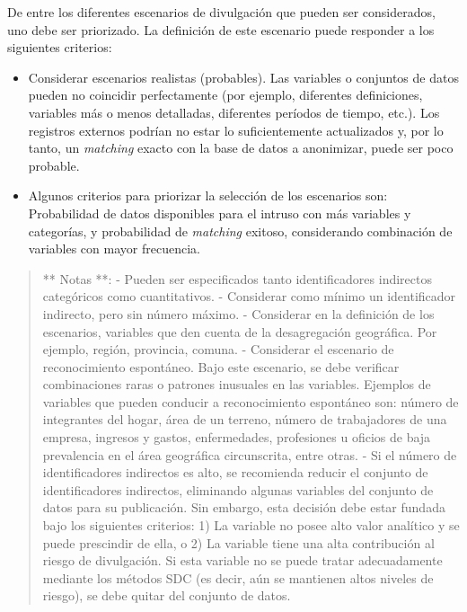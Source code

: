 \documentclass[
]{book}
\providecommand{\tightlist}{%
  \setlength{\itemsep}{0pt}\setlength{\parskip}{0pt}}
\theoremstyle{definition}
\theoremstyle{definition}
\theoremstyle{definition}
\theoremstyle{definition}
\theoremstyle{remark}
\begin{document}
De entre los diferentes escenarios de divulgación que pueden ser considerados, uno debe ser priorizado. La definición de este escenario puede responder a los siguientes criterios:

\begin{itemize}
\tightlist
\item
  Considerar escenarios realistas (probables). Las variables o conjuntos de datos pueden no coincidir perfectamente (por ejemplo, diferentes definiciones, variables más o menos detalladas, diferentes períodos de tiempo, etc.). Los registros externos podrían no estar lo suficientemente actualizados y, por lo tanto, un \emph{matching} exacto con la base de datos a anonimizar, puede ser poco probable.
\item
  Algunos criterios para priorizar la selección de los escenarios son: Probabilidad de datos disponibles para el intruso con más variables y categorías, y probabilidad de \emph{matching} exitoso, considerando combinación de variables con mayor frecuencia.
\end{itemize}

\begin{quote}
** Notas **:
- Pueden ser especificados tanto identificadores indirectos categóricos como cuantitativos. - Considerar como mínimo un identificador indirecto, pero sin número máximo.
- Considerar en la definición de los escenarios, variables que den cuenta de la desagregación geográfica. Por ejemplo, región, provincia, comuna.
- Considerar el escenario de reconocimiento espontáneo. Bajo este escenario, se debe verificar combinaciones raras o patrones inusuales en las variables. Ejemplos de variables que pueden conducir a reconocimiento espontáneo son: número de integrantes del hogar, área de un terreno, número de trabajadores de una empresa, ingresos y gastos, enfermedades, profesiones u oficios de baja prevalencia en el área geográfica circunscrita, entre otras.
- Si el número de identificadores indirectos es alto, se recomienda reducir el conjunto de identificadores indirectos, eliminando algunas variables del conjunto de datos para su publicación. Sin embargo, esta decisión debe estar fundada bajo los siguientes criterios: 1) La variable no posee alto valor analítico y se puede prescindir de ella, o 2) La variable tiene una alta contribución al riesgo de divulgación. Si esta variable no se puede tratar adecuadamente mediante los métodos SDC (es decir, aún se mantienen altos niveles de riesgo), se debe quitar del conjunto de datos.
\end{quote}
\end{document}
